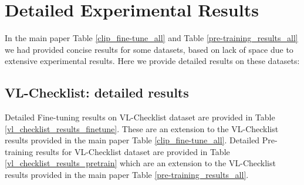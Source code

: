 \documentclass[11pt]{article}
\begin{document}
\section{Detailed Experimental Results}
\label{detailed_expt_results}
In the main paper Table \ref{clip_fine-tune_all} and Table \ref{pre-training_results_all} we had provided concise results for some datasets, based on lack of space due to extensive experimental results. Here we provide detailed results on these datasets:
\subsection{VL-Checklist: detailed results}
\label{vl_checklist_results}
Detailed Fine-tuning results on VL-Checklist dataset are provided in Table \ref{vl_checklist_results_finetune}. These are an extension to the VL-Checklist results provided in the main paper Table \ref{clip_fine-tune_all}. Detailed Pre-training results for VL-Checklist dataset are provided in Table \ref{vl_checklist_results_pretrain} which are an extension to the VL-Checklist results provided in the main paper Table \ref{pre-training_results_all}.
\end{document}
